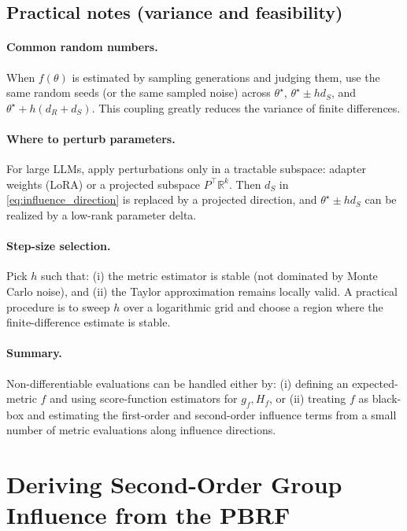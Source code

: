 \documentclass{article}
\theoremstyle{plain}
\theoremstyle{definition}
\theoremstyle{remark}
\begin{document}
\subsection{Practical notes (variance and feasibility)}
\paragraph{Common random numbers.}
When $f(\theta)$ is estimated by sampling generations and judging them,
use the same random seeds (or the same sampled noise) across
$\theta^\star$, $\theta^\star \pm h d_S$, and $\theta^\star + h(d_R+d_S)$.
This coupling greatly reduces the variance of finite differences.

\paragraph{Where to perturb parameters.}
For large LLMs, apply perturbations only in a tractable subspace:
adapter weights (LoRA) or a projected subspace $P^\top \mathbb{R}^k$.
Then $d_S$ in \eqref{eq:influence_direction} is replaced by a projected direction,
and $\theta^\star \pm h d_S$ can be realized by a low-rank parameter delta.

\paragraph{Step-size selection.}
Pick $h$ such that:
(i) the metric estimator is stable (not dominated by Monte Carlo noise),
and (ii) the Taylor approximation remains locally valid.
A practical procedure is to sweep $h$ over a logarithmic grid
and choose a region where the finite-difference estimate is stable.

\paragraph{Summary.}
Non-differentiable evaluations can be handled either by:
(i) defining an expected-metric $f$ and using score-function estimators for $g_f,H_f$,
or (ii) treating $f$ as black-box and estimating the first-order and second-order influence terms
from a small number of metric evaluations along influence directions.


\section{Deriving Second-Order Group Influence from the PBRF}
\label{sec:pbrf_derivation}
\end{document}
